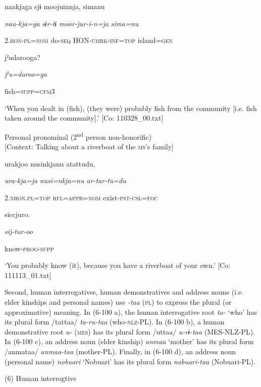 {\TM}
\gll naakjaga  sjɨ  moojuinnja,  simanu

      \textit{naa-kja=ga}  \textit{sɨr-tɨ}  \textit{moor-jur-i-n=ja}  \textit{sima=nu}

      2.\textsc{hon}-\textsc{pl}=\textsc{nom}  do-\textsc{seq}  HON-\textsc{umrk}-\textsc{inf}=\textsc{top}  island=\textsc{gen}

      jˀudarooga?

      \textit{jˀu=daroo=ga}

      fish=\textsc{supp}=\textsc{cfm}3

\glt ‘When you dealt in (fish), (they were) probably fish from the community [i.e. fish taken around the community].’ [Co: 110328\_00.txt]
\z

 \ex Personal pronominal (2\textsuperscript{nd} person non-honorific)\\{}
[Context: Talking about a riverboat of the \textsc{ms}’s family]

{\TM}
\gll urakjoo  nusinkjanu  atattudu,

      \textit{ura-kja=ja}  \textit{nusi=nkja=nu}  \textit{ar-tar-tu=du}

      2.\textsc{nhon}.\textsc{pl}=\textsc{top}  \textsc{rfl}=\textsc{appr}=\textsc{nom}  exist-\textsc{pst}-\textsc{csl}=\textsc{foc}

      siccjuro.

      \textit{sij-tur-oo}

      know-\textsc{prog}-\textsc{supp}

\glt ‘You probably know (it), because you have a riverboat of your own.’ [Co: 111113\_01.txt]
\z

  Second, human interrogatives, human demonstratives and address nouns (i.e. elder kinships and personal names) use \textit{{}-taa} (\textsc{pl}) to express the plural (or approximative) meaning. In (6-100 a), the human interrogative root \textit{ta-} ‘who’ has its plural form /tattaa/ \textit{ta-ru-taa} (who-\textsc{nlz}-PL). In (6-100 b), a human demonstrative root \textit{u-} (\textsc{mes}) has its plural form /uttaa/ \textit{u-rɨ-taa} (MES-NLZ-PL). In (6-100 c), an address noun (elder kinship) \textit{anmaa} ‘mother’ has its plural form /anmataa/ \textit{anmaa-taa} (mother-PL). Finally, in (6-100 d), an address noun (personal name) \textit{nobuari} ‘Nobuari’ has its plural form \textit{nobuari-taa} (Nobuari-PL).

(6) \ea Human interrogtive\\
\gll

